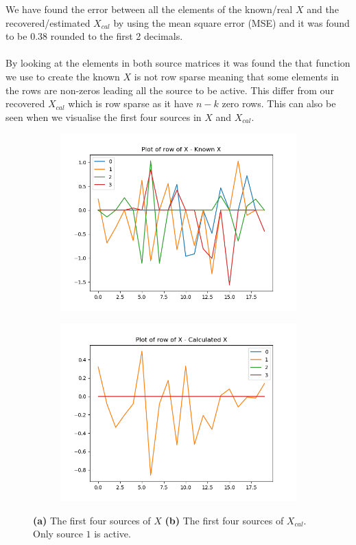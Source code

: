 \noindent
We have found the error between all the elements of the known/real $X$ and the recovered/estimated $X_{cal}$ by using the mean square error (MSE) and it was found to be $0.38$ rounded to the first 2 decimals.
\\ \\
By looking at the elements in both source matrices it was found the that function we use to create the known $X$ is not row sparse meaning that some elements in the rows are non-zeros leading all the source to be active. This differ from our recovered $X_{cal}$ which is row sparse as it have $n - k$ zero rows. This can also be seen when we visualise the first four sources in $X$ and $X_{cal}$.
\begin{figure}[H]
\centering
\begin{subfigure}{0.49\textwidth}
\centering
\includegraphics[width=\textwidth]{figures/cases/case1_3.png}
\caption{}
\label{fig:case1_3}
\end{subfigure}
\begin{subfigure}{0.49\textwidth}
\includegraphics[width=\textwidth]{figures/cases/case1_4.png}
\caption{}
\label{fig:case1_4}
\end{subfigure}
\caption{\textbf{(a)} The first four sources of $X$ \textbf{(b)} The first four sources of $X_{cal}$. Only source $1$ is active.}
\end{figure}
\noindent